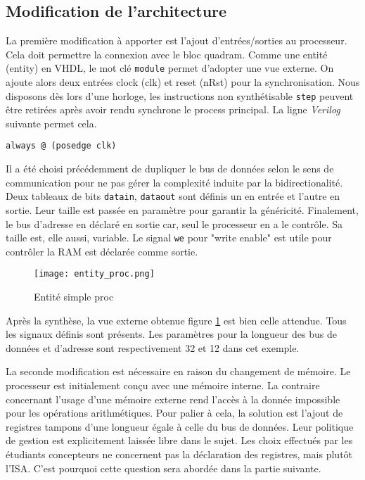 \subsection{Modification de l'architecture}
La première modification à apporter est l'ajout d'entrées/sorties au processeur.
Cela doit permettre la connexion avec le bloc quadram.
Comme une entité (entity) en VHDL, le mot clé \texttt{module} permet d'adopter une vue externe.
On ajoute alors deux entrées clock (clk) et reset (nRst) pour la synchronisation.
Nous disposons dès lors d'une horloge, les instructions non synthétisable \texttt{step} peuvent être retirées après avoir rendu synchrone le process principal. La ligne \textit{Verilog} suivante permet cela.
\begin{lstlisting}[style=vhdl]
    always @ (posedge clk)
\end{lstlisting}
Il a été choisi précédemment de dupliquer le bus de données selon le sens de communication pour ne pas gérer la complexité induite par la bidirectionalité. Deux tableaux de bits \texttt{datain}, \texttt{dataout} sont définis un en entrée et l'autre en sortie. Leur taille est passée en paramètre pour garantir la généricité. Finalement, le bus d'adresse en déclaré en sortie car, seul le processeur en a le contrôle. Sa taille est, elle aussi, variable.
Le signal \texttt{we} pour "write enable" est utile pour contrôler la \gls{RAM} est déclarée comme sortie.
\begin{figure}[h]
    \centering
    \texttt{[image: entity\_proc.png]}
    \caption{Entité simple proc}
    \label{entity_proc}
\end{figure}

Après la synthèse, la vue externe obtenue figure \ref{entity_proc} est bien celle attendue.
Tous les signaux définis sont présents. Les paramètres pour la longueur des bus de données et d'adresse sont respectivement 32 et 12 dans cet exemple. \\
\gap

La seconde modification est nécessaire en raison du changement de mémoire.
Le processeur est initialement conçu avec une mémoire interne.
La contraire concernant l'usage d'une mémoire externe rend l'accès à la donnée impossible pour les opérations arithmétiques.
Pour palier à cela, la solution est l'ajout de registres tampons d'une longueur égale à celle du bus de données.
Leur politique de gestion est explicitement laissée libre dans le sujet.
Les choix effectués par les étudiants concepteurs ne concernent pas la déclaration des registres, mais plutôt l'\gls{ISA}.
C'est pourquoi cette question sera abordée dans la partie suivante. \\
\gap

